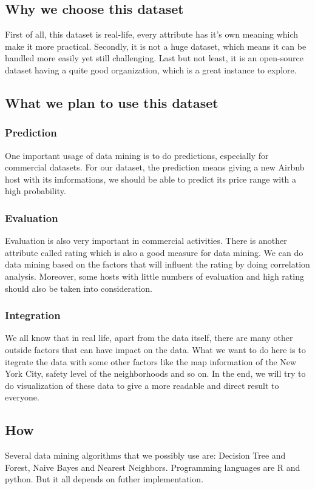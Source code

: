 \documentclass{sig-alternate}
\begin{document}
\subsection{Why we choose this dataset}
First of all, this dataset is real-life, every attribute has it's own meaning which make it more practical. 
Secondly, it is not a huge dataset, which means it can be handled more easily yet still challenging. 
Last but not least, it is an open-source dataset having a quite good organization, which is a great instance to explore.

\subsection{What we plan to use this dataset}
\subsubsection{Prediction}
One important usage of data mining is to do predictions, especially for commercial
datasets. For our dataset, the prediction means giving a new Airbnb host with its imformations, 
we should be able to predict its price range with a high probability.
\subsubsection{Evaluation}
Evaluation is also very important in commercial activities. 
There is another attribute called rating which is also a good measure for data mining. 
We can do data mining based on the factors that will influent the rating by doing correlation
analysis. Moreover, some hosts with little numbers of evaluation and high rating should also be taken into consideration. 
\subsubsection{Integration}
We all know that in real life, apart from the data itself, there are many other outside factors that can 
have impact on the data. What we want to do here is to itegrate the data with some other factors
like the map information of the New York City, safety level of the neighborhoods and so on.
In the end, we will try to do visualization of these data to give a more readable and direct result to everyone.

\subsection{How}
Several data mining algorithms that we possibly use are: Decision Tree and Forest, Naive Bayes and Nearest Neighbors.
Programming languages are R and python. But it all depends on futher implementation.
\end{document}
